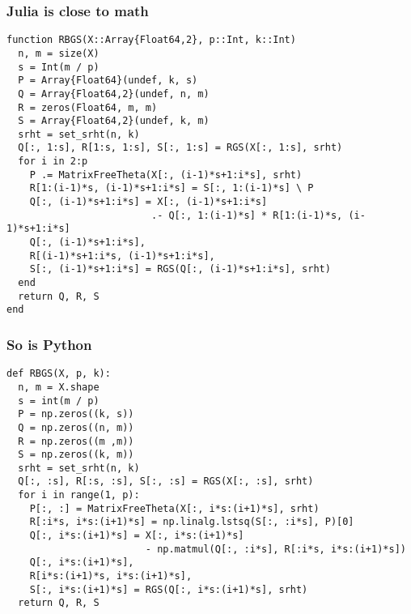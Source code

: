 \documentclass[t,usepdftitle=false]{beamer}
\begin{document}
\begin{frame}[fragile]
\frametitle{Julia is close to math}
\footnotesize
\begin{verbatim}
function RBGS(X::Array{Float64,2}, p::Int, k::Int)
  n, m = size(X)
  s = Int(m / p)  
  P = Array{Float64}(undef, k, s)
  Q = Array{Float64,2}(undef, n, m)
  R = zeros(Float64, m, m)
  S = Array{Float64,2}(undef, k, m)
  srht = set_srht(n, k)
  Q[:, 1:s], R[1:s, 1:s], S[:, 1:s] = RGS(X[:, 1:s], srht)
  for i in 2:p
    P .= MatrixFreeTheta(X[:, (i-1)*s+1:i*s], srht)
    R[1:(i-1)*s, (i-1)*s+1:i*s] = S[:, 1:(i-1)*s] \ P
    Q[:, (i-1)*s+1:i*s] = X[:, (i-1)*s+1:i*s] 
                         .- Q[:, 1:(i-1)*s] * R[1:(i-1)*s, (i-1)*s+1:i*s]
    Q[:, (i-1)*s+1:i*s], 
    R[(i-1)*s+1:i*s, (i-1)*s+1:i*s], 
    S[:, (i-1)*s+1:i*s] = RGS(Q[:, (i-1)*s+1:i*s], srht)
  end
  return Q, R, S
end
\end{verbatim}
\end{frame}  

\begin{frame}[fragile]
\frametitle{So is Python}
\footnotesize
\begin{verbatim}
def RBGS(X, p, k):
  n, m = X.shape
  s = int(m / p)
  P = np.zeros((k, s))
  Q = np.zeros((n, m))
  R = np.zeros((m ,m))
  S = np.zeros((k, m))
  srht = set_srht(n, k)
  Q[:, :s], R[:s, :s], S[:, :s] = RGS(X[:, :s], srht)
  for i in range(1, p):
    P[:, :] = MatrixFreeTheta(X[:, i*s:(i+1)*s], srht)
    R[:i*s, i*s:(i+1)*s] = np.linalg.lstsq(S[:, :i*s], P)[0]
    Q[:, i*s:(i+1)*s] = X[:, i*s:(i+1)*s] 
                        - np.matmul(Q[:, :i*s], R[:i*s, i*s:(i+1)*s])
    Q[:, i*s:(i+1)*s], 
    R[i*s:(i+1)*s, i*s:(i+1)*s], 
    S[:, i*s:(i+1)*s] = RGS(Q[:, i*s:(i+1)*s], srht)
  return Q, R, S
\end{verbatim}
\end{frame} 
\end{document}
